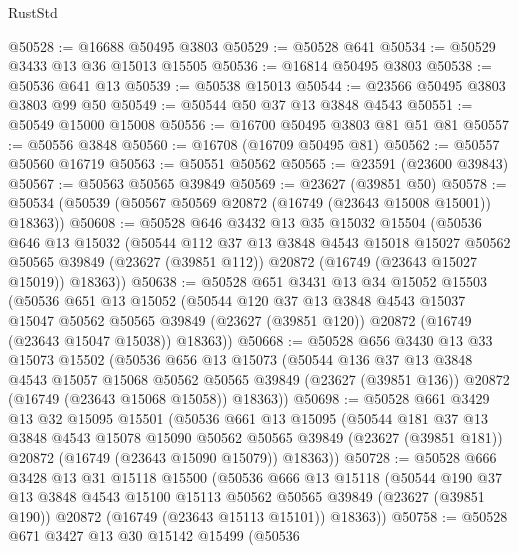\begin{lexlean}{RustStd}
\begin{coremodule}
@50528 := @16688 @50495 @3803
@50529 := @50528 @641
@50534 := @50529 @3433 @13 @36 @15013 @15505
@50536 := @16814 @50495 @3803
@50538 := @50536 @641 @13
@50539 := @50538 @15013
@50544 := @23566 @50495 @3803 @3803 @99 @50
@50549 := @50544 @50 @37 @13 @3848 @4543
@50551 := @50549 @15000 @15008
@50556 := @16700 @50495 @3803 @81 @51 @81
@50557 := @50556 @3848
@50560 := @16708 (@16709 @50495 @81)
@50562 := @50557 @50560 @16719
@50563 := @50551 @50562
@50565 := @23591 (@23600 @39843)
@50567 := @50563 @50565 @39849
@50569 := @23627 (@39851 @50)
@50578 := @50534 (@50539 (@50567 @50569 @20872 (@16749 (@23643 @15008 @15001)) @18363))
@50608 := @50528
    @646
    @3432
    @13
    @35
    @15032
    @15504
    (@50536
      @646
      @13
      @15032
      (@50544
        @112
        @37
        @13
        @3848
        @4543
        @15018
        @15027
        @50562
        @50565
        @39849
        (@23627 (@39851 @112))
        @20872
        (@16749 (@23643 @15027 @15019))
        @18363))
@50638 := @50528
    @651
    @3431
    @13
    @34
    @15052
    @15503
    (@50536
      @651
      @13
      @15052
      (@50544
        @120
        @37
        @13
        @3848
        @4543
        @15037
        @15047
        @50562
        @50565
        @39849
        (@23627 (@39851 @120))
        @20872
        (@16749 (@23643 @15047 @15038))
        @18363))
@50668 := @50528
    @656
    @3430
    @13
    @33
    @15073
    @15502
    (@50536
      @656
      @13
      @15073
      (@50544
        @136
        @37
        @13
        @3848
        @4543
        @15057
        @15068
        @50562
        @50565
        @39849
        (@23627 (@39851 @136))
        @20872
        (@16749 (@23643 @15068 @15058))
        @18363))
@50698 := @50528
    @661
    @3429
    @13
    @32
    @15095
    @15501
    (@50536
      @661
      @13
      @15095
      (@50544
        @181
        @37
        @13
        @3848
        @4543
        @15078
        @15090
        @50562
        @50565
        @39849
        (@23627 (@39851 @181))
        @20872
        (@16749 (@23643 @15090 @15079))
        @18363))
@50728 := @50528
    @666
    @3428
    @13
    @31
    @15118
    @15500
    (@50536
      @666
      @13
      @15118
      (@50544
        @190
        @37
        @13
        @3848
        @4543
        @15100
        @15113
        @50562
        @50565
        @39849
        (@23627 (@39851 @190))
        @20872
        (@16749 (@23643 @15113 @15101))
        @18363))
@50758 := @50528
    @671
    @3427
    @13
    @30
    @15142
    @15499
    (@50536

\end{coremodule}
\end{lexlean}
